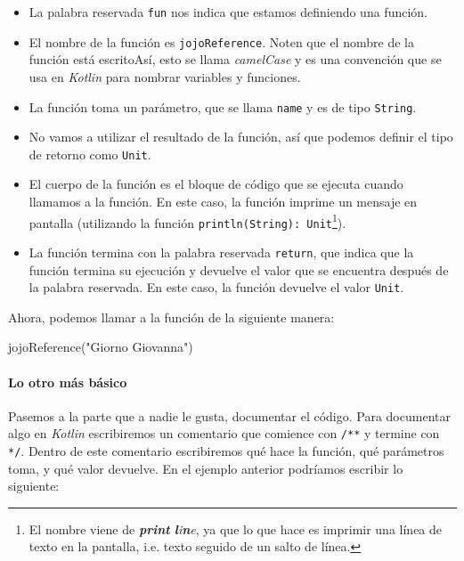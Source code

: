       \begin{itemize}
        \item La palabra reservada \texttt{fun} nos indica que estamos definiendo una función.
        \item El nombre de la función es \texttt{jojoReference}.
          Noten que el nombre de la función está escritoAsí, esto se llama \textit{camelCase} y es
          una convención que se usa en \textit{Kotlin} para nombrar variables y funciones.
        \item La función toma un parámetro, que se llama \texttt{name} y es de tipo \texttt{String}.
        \item No vamos a utilizar el resultado de la función, así que podemos definir el tipo de 
          retorno como \texttt{Unit}.
        \item El cuerpo de la función es el bloque de código que se ejecuta cuando llamamos a la
          función.
          En este caso, la función imprime un mensaje en pantalla (utilizando la función 
          \texttt{println(String): Unit}\footnote{El nombre viene de \textit{\textbf{print} 
          \textbf{l}i\textbf{n}e}, ya que lo que hace es imprimir una línea de texto en la pantalla, 
          i.e. texto seguido de un salto de línea.}).
        \item La función termina con la palabra reservada \texttt{return}, que indica que la función
          termina su ejecución y devuelve el valor que se encuentra después de la palabra reservada.
          En este caso, la función devuelve el valor \texttt{Unit}.   
      \end{itemize}

      Ahora, podemos llamar a la función de la siguiente manera:

      \begin{kotlin}
        jojoReference("Giorno Giovanna")
      \end{kotlin}

    \paragraph{Lo otro más básico}
      Pasemos a la parte que a nadie le gusta, documentar el código.
      Para documentar algo en \textit{Kotlin} escribiremos un comentario que comience con \texttt{/**}
      y termine con \texttt{*/}.
      Dentro de este comentario escribiremos qué hace la función, qué parámetros toma, y qué valor
      devuelve.
      En el ejemplo anterior podríamos escribir lo siguiente:

